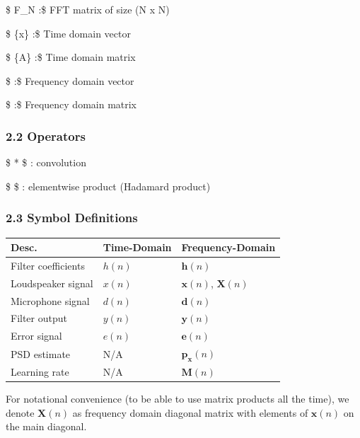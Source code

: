 \documentclass[11pt]{article}
\begin{document}
\$ F\_N :\$ FFT matrix of size (N x N)

\$ \{x\} :\$ Time domain vector

\$ \{A\} :\$ Time domain matrix

\$  :\$ Frequency domain vector

\$  :\$ Frequency domain matrix

\hypertarget{operators}{%
\subsubsection{2.2 Operators}\label{operators}}

\$ * \$ : convolution

\$ \odot \$ : elementwise product (Hadamard product)

\hypertarget{symbol-definitions}{%
\subsubsection{2.3 Symbol Definitions}\label{symbol-definitions}}

\begin{longtable}[]{@{}lll@{}}
\toprule
Desc. & Time-Domain & Frequency-Domain\tabularnewline
\midrule
\endhead
Filter coefficients & \(h(n)\) & \(\mathbf{h}(n)\)\tabularnewline
Loudspeaker signal & \(x(n)\) & \(\mathbf{x}(n)\),
\(\mathbf{X}(n)\)\tabularnewline
Microphone signal & \(d(n)\) & \(\mathbf{d}(n)\)\tabularnewline
Filter output & \(y(n)\) & \(\mathbf{y}(n)\)\tabularnewline
Error signal & \(e(n)\) & \(\mathbf{e}(n)\)\tabularnewline
PSD estimate & N/A & \(\mathbf{p_x}(n)\)\tabularnewline
Learning rate & N/A & \(\mathbf{M}(n)\)\tabularnewline
\bottomrule
\end{longtable}

For notational convenience (to be able to use matrix products all the
time), we denote \(\mathbf{X}(n)\) as frequency domain diagonal matrix
with elements of \(\mathbf{x}(n)\) on the main diagonal.
\end{document}
